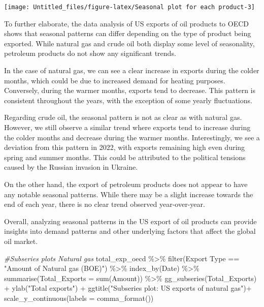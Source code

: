 \documentclass[
]{article}
\newenvironment{Shaded}{\begin{snugshade}}{\end{snugshade}}
\newcommand{\AttributeTok}[1]{\textcolor[rgb]{0.77,0.63,0.00}{#1}}
\newcommand{\CommentTok}[1]{\textcolor[rgb]{0.56,0.35,0.01}{\textit{#1}}}
\newcommand{\FunctionTok}[1]{\textcolor[rgb]{0.00,0.00,0.00}{#1}}
\newcommand{\NormalTok}[1]{#1}
\newcommand{\SpecialCharTok}[1]{\textcolor[rgb]{0.00,0.00,0.00}{#1}}
\newcommand{\StringTok}[1]{\textcolor[rgb]{0.31,0.60,0.02}{#1}}
\begin{document}
\begin{center}\texttt{[image: Untitled\_files/figure-latex/Seasonal plot for each product-3]} \end{center}

To further elaborate, the data analysis of US exports of oil products to
OECD shows that seasonal patterns can differ depending on the type of
product being exported. While natural gas and crude oil both display
some level of seasonality, petroleum products do not show any
significant trends.

In the case of natural gas, we can see a clear increase in exports
during the colder months, which could be due to increased demand for
heating purposes. Conversely, during the warmer months, exports tend to
decrease. This pattern is consistent throughout the years, with the
exception of some yearly fluctuations.

Regarding crude oil, the seasonal pattern is not as clear as with
natural gas. However, we still observe a similar trend where exports
tend to increase during the colder months and decrease during the warmer
months. Interestingly, we see a deviation from this pattern in 2022,
with exports remaining high even during spring and summer months. This
could be attributed to the political tensions caused by the Russian
invasion in Ukraine.

On the other hand, the export of petroleum products does not appear to
have any notable seasonal patterns. While there may be a slight increase
towards the end of each year, there is no clear trend observed
year-over-year.

Overall, analyzing seasonal patterns in the US export of oil products
can provide insights into demand patterns and other underlying factors
that affect the global oil market.

\begin{Shaded}
\begin{Highlighting}[]
\CommentTok{\#Subseries plots Natural gas}
\NormalTok{total\_exp\_oecd }\SpecialCharTok{\%\textgreater{}\%} \FunctionTok{filter}\NormalTok{(}\StringTok{\textasciigrave{}}\AttributeTok{Export Type}\StringTok{\textasciigrave{}} \SpecialCharTok{==} \StringTok{"Amount of Natural gas (BOE)"}\NormalTok{) }\SpecialCharTok{\%\textgreater{}\%} 
  \FunctionTok{index\_by}\NormalTok{(Date) }\SpecialCharTok{\%\textgreater{}\%} 
  \FunctionTok{summarise}\NormalTok{(}\AttributeTok{Total\_Exports =} \FunctionTok{sum}\NormalTok{(}\StringTok{\textasciigrave{}}\AttributeTok{Amount}\StringTok{\textasciigrave{}}\NormalTok{)) }\SpecialCharTok{\%\textgreater{}\%} 
  \FunctionTok{gg\_subseries}\NormalTok{(Total\_Exports) }\SpecialCharTok{+} 
  \FunctionTok{ylab}\NormalTok{(}\StringTok{"Total exports"}\NormalTok{) }\SpecialCharTok{+} 
  \FunctionTok{ggtitle}\NormalTok{(}\StringTok{"Subseries plot: US exports of natural gas"}\NormalTok{)}\SpecialCharTok{+}
  \FunctionTok{scale\_y\_continuous}\NormalTok{(}\AttributeTok{labels =} \FunctionTok{comma\_format}\NormalTok{())}
\end{Highlighting}
\end{Shaded}
\end{document}
